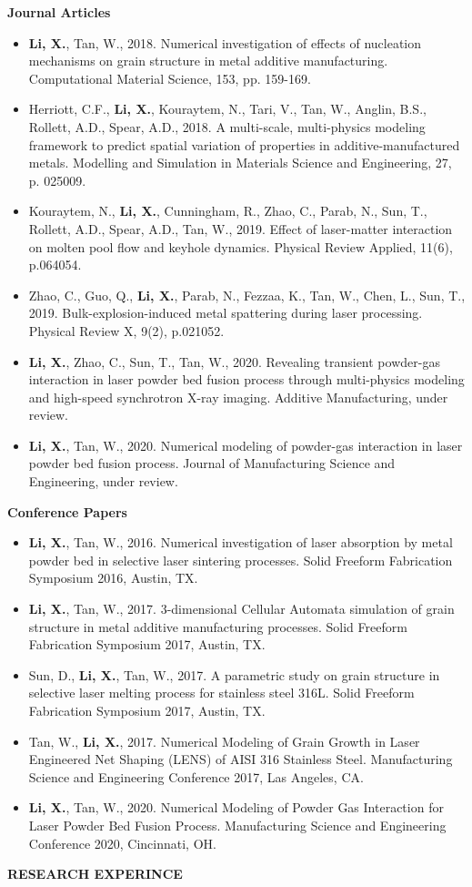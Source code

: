 \documentclass[11pt, letterpaper]{article}
\begin{document}
\textbf{Journal Articles}
\begin{itemize}[leftmargin=*, labelsep=4mm]
   \item \textbf{Li, X.}, Tan, W., 2018. Numerical investigation of effects of nucleation mechanisms on grain structure in metal additive manufacturing. Computational Material Science, 153, pp. 159-169.
   \item Herriott, C.F., \textbf{Li, X.}, Kouraytem, N., Tari, V., Tan, W., Anglin, B.S., Rollett, A.D., Spear, A.D., 2018. A multi-scale, multi-physics modeling framework to predict spatial variation of properties in additive-manufactured metals. Modelling and Simulation in Materials Science and Engineering, 27, p. 025009.
   \item Kouraytem, N., \textbf{Li, X.}, Cunningham, R., Zhao, C., Parab, N., Sun, T., Rollett, A.D., Spear, A.D., Tan, W., 2019. Effect of laser-matter interaction on molten pool flow and keyhole dynamics. Physical Review Applied, 11(6), p.064054.
   \item Zhao, C., Guo, Q., \textbf{Li, X.}, Parab, N., Fezzaa, K., Tan, W., Chen, L., Sun, T., 2019. Bulk-explosion-induced metal spattering during laser processing. Physical Review X, 9(2), p.021052.
   \item \textbf{Li, X.}, Zhao, C., Sun, T., Tan, W., 2020. Revealing transient powder-gas interaction in laser powder bed fusion process through multi-physics modeling and high-speed synchrotron X-ray imaging. Additive Manufacturing, under review. 
   \item \textbf{Li, X.}, Tan, W., 2020. Numerical modeling of powder-gas interaction in laser powder bed fusion process. Journal of Manufacturing Science and Engineering, under review. 
\end{itemize}
\vspace{3pt}
\textbf{Conference Papers}
\begin{itemize}[leftmargin=*, labelsep=5mm]
   \item \textbf{Li, X.}, Tan, W., 2016. Numerical investigation of laser absorption by metal powder bed in selective laser sintering processes. Solid Freeform Fabrication Symposium 2016, Austin, TX.
   \item \textbf{Li, X.}, Tan, W., 2017. 3-dimensional Cellular Automata simulation of grain structure in metal additive manufacturing processes. Solid Freeform Fabrication Symposium 2017, Austin, TX.
   \item Sun, D., \textbf{Li, X.}, Tan, W., 2017. A parametric study on grain structure in selective laser melting process for stainless steel 316L. Solid Freeform Fabrication Symposium 2017, Austin, TX.
   \item Tan, W., \textbf{Li, X.}, 2017. Numerical Modeling of Grain Growth in Laser Engineered Net Shaping (LENS) of AISI 316 Stainless Steel. Manufacturing Science and Engineering Conference 2017, Las Angeles, CA.
   \item \textbf{Li, X.}, Tan, W., 2020. Numerical Modeling of Powder Gas Interaction for Laser Powder Bed Fusion Process. Manufacturing Science and Engineering Conference 2020, Cincinnati, OH.
\end{itemize}
\vspace{-3pt}
\paraspace
\textbf{RESEARCH EXPERINCE}
\end{document}
